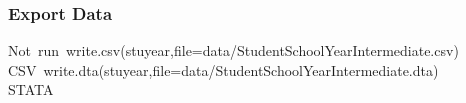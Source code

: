 \documentclass[12pt]{article}
\makeatletter
\newcommand{\hlcomment}[1]{\textcolor[rgb]{0.180392156862745,0.6,0.341176470588235}{#1}}%
\newcommand{\hlstd}[1]{\textcolor[rgb]{0,0,0}{#1}}%
\newenvironment{kframe}{%
 \def\FrameCommand##1{\hskip\@totalleftmargin \hskip-\fboxsep
 \colorbox{shadecolor}{##1}\hskip-\fboxsep
     \hskip-\linewidth \hskip-\@totalleftmargin \hskip\columnwidth}%
 \MakeFramed {\advance\hsize-\width
   \@totalleftmargin\z@ \linewidth\hsize
   \@setminipage}}%
 {\par\unskip\endMakeFramed}
\newenvironment{knitrout}{}{} %
\renewenvironment{knitrout}{\begin{footnotesize}}{\end{footnotesize}}
\makeatother
\begin{document}
\subsubsection{Export Data}

\begin{knitrout}
\color{fgcolor}\begin{kframe}
\begin{flushleft}
\ttfamily\noindent
\hlcomment{\usebox{\hlnormalsizeboxhash}{\ }Not{\ }run{\ }write.csv(stuyear,file=\usebox{\hlnormalsizeboxsinglequote}data/Student\usebox{\hlnormalsizeboxunderscore}School\usebox{\hlnormalsizeboxunderscore}Year\usebox{\hlnormalsizeboxunderscore}Intermediate.csv\usebox{\hlnormalsizeboxsinglequote}){\ }\usebox{\hlnormalsizeboxhash}}\hspace*{\fill}\\
\hlstd{}\hlcomment{\usebox{\hlnormalsizeboxhash}{\ }CSV{\ }write.dta(stuyear,file=\usebox{\hlnormalsizeboxsinglequote}data/Student\usebox{\hlnormalsizeboxunderscore}School\usebox{\hlnormalsizeboxunderscore}Year\usebox{\hlnormalsizeboxunderscore}Intermediate.dta\usebox{\hlnormalsizeboxsinglequote}){\ }\usebox{\hlnormalsizeboxhash}}\hspace*{\fill}\\
\hlstd{}\hlcomment{\usebox{\hlnormalsizeboxhash}{\ }STATA}\mbox{}
\normalfont
\end{flushleft}
\end{kframe}
\end{knitrout}
\end{document}
